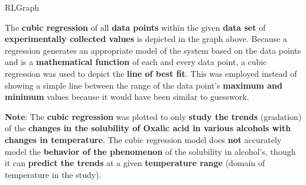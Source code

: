             





{RLGraph}

{The \textbf{cubic regression} of all \textbf{data points} within the given \textbf{data set} of \textbf{experimentally collected values} is depicted in the graph above. Because a regression generates an appropriate model of the system based on the data points and is a \textbf{mathematical function} of each and every data point, a cubic regression was used to depict the \textbf{line of best fit}. This was employed instead of showing a simple line between the range of the data point's \textbf{maximum and minimum} values because it would have been similar to guesswork.}

{\textbf{Note}: The \textbf{cubic regression} was plotted to only \textbf{study the trends} (gradation) of the \textbf{changes in the solubility of Oxalic acid in various alcohols with changes in temperature}. The cubic regression model does \textbf{not} accurately model the \textbf{behavior of the phenomenon} of the solubility in alcohol's, though it can \textbf{predict the trends} at a given \textbf{temperature range} (domain of temperature in the study).}

